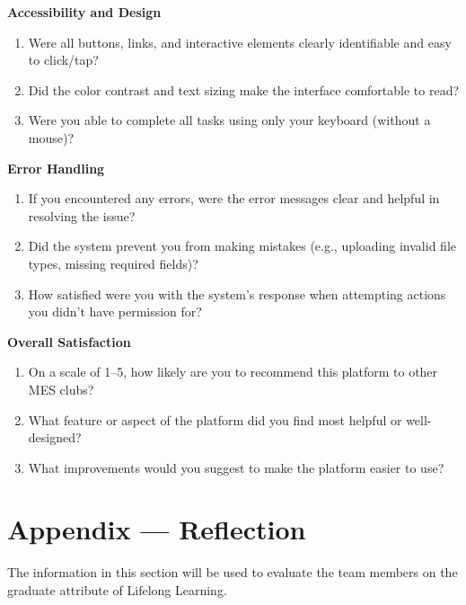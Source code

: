 \documentclass[12pt, titlepage]{article}
\begin{document}
  \textbf{Accessibility and Design}
  \begin{enumerate}
      \item Were all buttons, links, and interactive elements clearly identifiable and easy to click/tap?
      \item Did the color contrast and text sizing make the interface comfortable to read?
      \item Were you able to complete all tasks using only your keyboard (without a mouse)?
  \end{enumerate}

  \textbf{Error Handling}
  \begin{enumerate}
      \item If you encountered any errors, were the error messages clear and helpful in resolving the issue?
      \item Did the system prevent you from making mistakes (e.g., uploading invalid file types, missing required fields)?
      \item How satisfied were you with the system's response when attempting actions you didn't have permission for?
  \end{enumerate}

  \textbf{Overall Satisfaction}
  \begin{enumerate}
      \item On a scale of 1--5, how likely are you to recommend this platform to other MES clubs?
      \item What feature or aspect of the platform did you find most helpful or well-designed?
      \item What improvements would you suggest to make the platform easier to use?
  \end{enumerate}

\newpage{}
\section*{Appendix --- Reflection}

The information in this section will be used to evaluate the team members on the
graduate attribute of Lifelong Learning.


\end{document}
